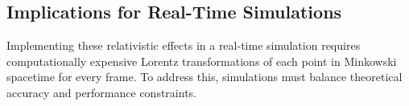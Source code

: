 \documentclass[a4paper]{article}
\begin{document}






\subsection{Implications for Real-Time Simulations}
Implementing these relativistic effects in a real-time simulation requires computationally expensive Lorentz transformations of each point in Minkowski spacetime for every frame. To address this, simulations must balance theoretical accuracy and performance constraints.
\end{document}
